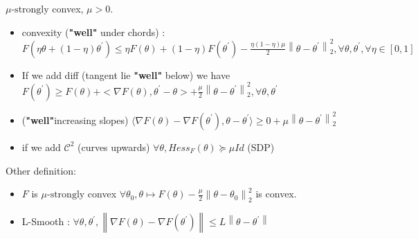 $ \mu \text{-strongly}$ convex, $ \mu > 0 $. 
\begin{itemize}
    \item convexity (\textbf{"well"} under chords) : $ F(\eta \theta + (1 - \eta ) \theta ^\prime ) \leq  \eta F(\theta ) + (1 - \eta ) F(\theta ^\prime ) - \frac{\eta (1 - \eta ) \mu }{2} \left\| \theta - \theta ^\prime  \right\| ^2 _2 , \forall \theta , \theta ^\prime , \forall \eta  \in 
    [0, 1] $ 
    \item If we add diff (tangent lie \textbf{"well"} below) we have $ F(\theta ^\prime ) \geq F(\theta ) + < \nabla F(\theta ) , \theta ^\prime - \theta  > + \frac{\mu }{2} \left\| \theta - \theta ^\prime  \right\|^2_2, \forall \theta , \theta ^\prime  $ 
    \item (\textbf{"well"}increasing slopes) $ \langle \nabla F(\theta ) - \nabla F(\theta ^\prime ), \theta - \theta ^\prime \rangle \geq 0 + \mu \left\| \theta - \theta ^\prime  \right\| _2 ^2  $
    \item if we add $ \mathcal{C}^2 $ (curves upwards) $ \forall \theta , Hess_F (\theta ) \succeq \mu Id $ (SDP)
\end{itemize}
Other definition:
\begin{itemize}
    \item $ F $ is $ \mu \text{-strongly} $ convex $ \forall \theta _0, \theta \mapsto F(\theta ) - \frac{\mu }{2} \left\| \theta  - \theta _0 \right\|^2 _2 $ is convex.
    \item L-Smooth : $ \forall \theta , \theta ^\prime, \left\| \nabla F(\theta ) - \nabla F(\theta ^\prime ) \right\| \leq  L \left\| \theta - \theta ^\prime  \right\| $ 
\end{itemize}

